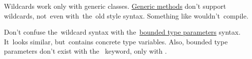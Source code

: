 \note Wildcards work only with generic classes.
\hyperref[javagenericmethod]{Generic methods} don't support wildcards, not~even with~the~old style syntax.
Something like  wouldn't~compile.

\warning Don't confuse the~wildcard syntax with the~\hyperref[javagenericsbound]{bounded type parameters} syntax.
It~looks similar, but~contains concrete type variables.
Also, bounded type parameters don't exist with the~ keyword, only with .
